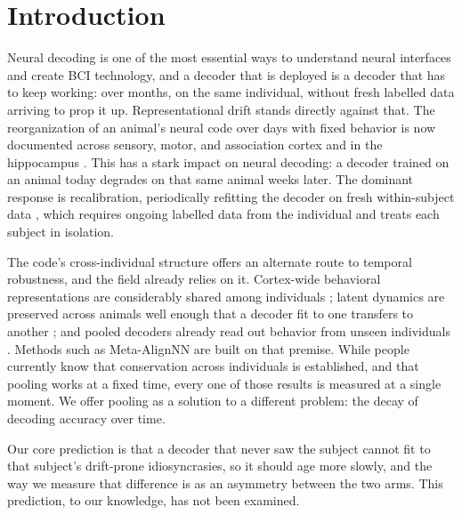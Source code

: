 \documentclass[mlabstract,onecolumn]{jmlr}
\begin{document}
\section{Introduction}
Neural decoding is one of the most essential ways to understand neural interfaces and create BCI
technology, and a decoder that is deployed is a decoder that has to keep working: over months, on
the same individual, without fresh labelled data arriving to prop it up. Representational drift
stands directly against that. The reorganization of an animal's neural code over days with fixed
behavior is now documented across sensory, motor, and association cortex and in the hippocampus
\citep{rule2020,driscoll2017,schoonover2021}. This has a stark impact on neural decoding: a decoder
trained on an animal today degrades on that same animal weeks later. The dominant response is
recalibration, periodically refitting the decoder on fresh within-subject data
\citep{degenhart2020,jarosiewicz2015}, which requires ongoing labelled data from the individual and
treats each subject in isolation.

The code's cross-individual structure offers an alternate route to temporal robustness, and the
field already relies on it. Cortex-wide behavioral representations are considerably shared among
individuals \citep{musall2019,macdowell2020,macdowell2024}; latent dynamics are preserved across
animals well enough that a decoder fit to one transfers to another \citep{safaie2023}; and pooled
decoders already read out behavior from unseen individuals \citep{wicat2026,neds2025,peterson2021}.
Methods such as Meta-AlignNN \citep{metaalign2025} are built on that premise. While people currently
know that conservation across individuals is established, and that pooling works at a fixed time,
every one of those results is measured at a single moment. We offer pooling as a solution to a
different problem: the decay of decoding accuracy over time.

Our core prediction is that a decoder that never saw the subject cannot fit to that subject's
drift-prone idiosyncrasies, so it should age more slowly, and the way we measure that difference is
as an asymmetry between the two arms. This prediction, to our knowledge, has not been examined.
\end{document}
